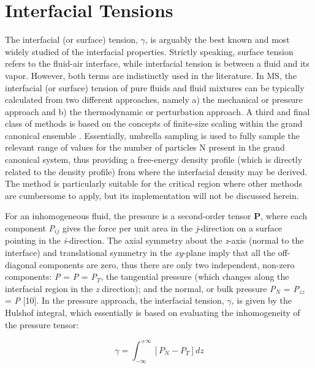 \documentclass{scrbook}
\begin{document}
\section{Interfacial Tensions}

The interfacial (or surface) tension, $\gamma$, is arguably the best known and
most widely studied of the interfacial properties. Strictly speaking, surface
tension refers to the fluid-air interface, while interfacial tension is between
a fluid and its vapor. However, both terms are indistinctly used in the
literature. In MS, the interfacial (or surface) tension of pure fluids and
fluid mixtures can be typically calculated from two different approaches,
namely a) the mechanical or pressure approach and b) the thermodynamic or
perturbation approach. A third and final class of methods is based on the
concepts of finite-size scaling within the grand canonical ensemble 
\citep{binder1982,errington2003}. Essentially, umbrella
sampling is used to fully sample the relevant range of values for the number of
particles N present in the grand canonical system, thus providing a free-energy
density profile (which is directly related to the density profile) from where
the interfacial density may be derived. The method is particularly suitable for
the critical region where other methods are cumbersome to apply, but its
implementation \cite{allen2017,schrader2009} will not be discussed
herein.

For an inhomogeneous fluid, the pressure is a second-order tensor \textbf{P},
where each component \textit{P}$_{ij}$ gives the force per unit area in the
\textit{j}-direction on a surface pointing in the \textit{i}-direction. The
axial symmetry about the \textit{z}-axis (normal to the interface) and
translational symmetry in the \textit{xy}-plane imply that all the off-diagonal
components are zero, thus there are only two independent, non-zero components:
\textit{P}\textit{} = \textit{P}\textit{}
= \textit{P}$_{T}$, the tangential pressure (which changes along the
interfacial region in the \textit{z} direction); and the normal, or bulk
pressure \textit{P}$_{N}$ = \textit{P}$_{zz}$ = \textit{P} [10]. In the
pressure approach, the interfacial tension, $\gamma$\textit{,} is given by the
Hulshof integral\citep{hulshof1901}, which
essentially is based on evaluating the inhomogeneity of the pressure tensor:

\begin{equation}
\gamma=\int_{-\infty}^{+\infty}\left[P_{N}-P_{T}\right]dz
\end{equation}
\end{document}
